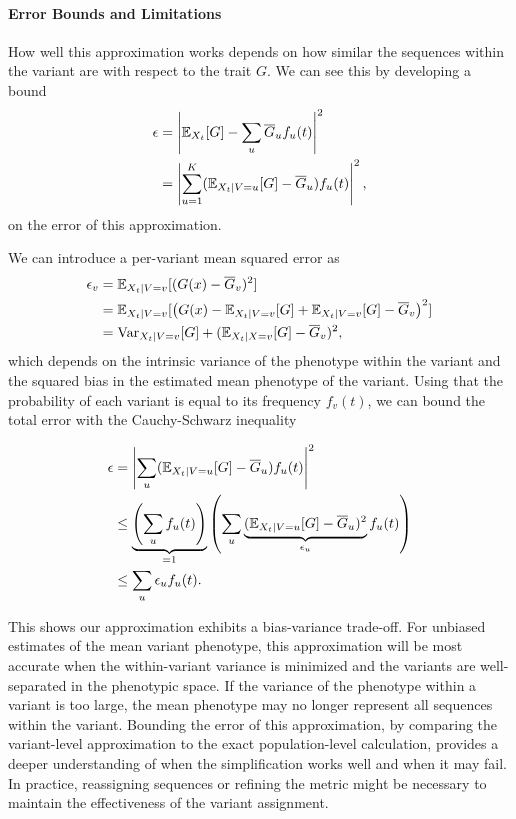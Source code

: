 \paragraph{Error Bounds and Limitations}

How well this approximation works depends on how similar the sequences within the variant are with respect to the trait $G$. 
We can see this by developing a bound 
\begin{align}
  \epsilon &= \left| \mathbb{E}_{X_t}[G]  - \sum_{u} \overline{G}_u f_{u}(t) \right|^2\\ 
           &= \left| \sum_{u=1}^{K} (\mathbb{E}_{X_{t} \mid V=u}[G] - \overline{G}_u) f_u(t) \right|^2,
\end{align}
on the error of this approximation.

We can introduce a per-variant mean squared error as 
\begin{align}
  \epsilon_v &= \mathbb{E}_{X_{t} \mid V=v}[(G(x) - \overline{G}_v)^2]\\
           &= \mathbb{E}_{X_{t} \mid V=v}[\left(G(x) - \mathbb{E}_{X_{t} \mid V=v}[G] + \mathbb{E}_{X_{t} \mid V=v}[G] - \overline{G}_v\right)^2 ]\\
           &= \text{Var}_{X_{t} \mid V=v}[G] + (\mathbb{E}_{X_t \mid X=v}[G] - \overline{G}_v)^2,
\end{align}
which depends on the intrinsic variance of the phenotype within the variant and the squared bias in the estimated mean phenotype of the variant.
Using that the probability of each variant is equal to its frequency $f_v(t)$, we can bound the total error with the Cauchy-Schwarz inequality

\begin{align}
  \epsilon  &= \left| \sum_{u} (\mathbb{E}_{X_{t} \mid V=u}[G] - \overline{G}_u) f_u(t)  \right|^2\\
            &\leq \underbrace{\left(\sum_{u} f_u(t) \right)}_{=1} \left(\sum_{u}  \underbrace{(\mathbb{E}_{X_{t} \mid V=u}[G] - \overline{G}_u)^2}_{\epsilon_u} f_u(t)\right)\\
            &\leq \sum_{u} \epsilon_u f_u(t).
\end{align}

This shows our approximation exhibits a bias-variance trade-off.
For unbiased estimates of the mean variant phenotype, this approximation will be most accurate when the within-variant variance is minimized and the variants are well-separated in the phenotypic space.
If the variance of the phenotype within a variant is too large, the mean phenotype may no longer represent all sequences within the variant.
Bounding the error of this approximation, by comparing the variant-level approximation to the exact population-level calculation, provides a deeper understanding of when the simplification works well and when it may fail.
In practice, reassigning sequences or refining the metric might be necessary to maintain the effectiveness of the variant assignment.

